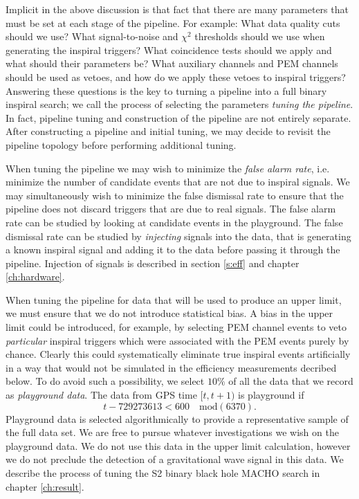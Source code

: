 Implicit in the above discussion is that fact that there are many parameters
that must be set at each stage of the pipeline. For example: What data quality
cuts should we use? What signal-to-noise and $\chi^2$ thresholds should we use
when generating the inspiral triggers? What coincidence tests should we apply
and what should their parameters be? What auxiliary channels and PEM channels
should be used as vetoes, and how do we apply these vetoes to inspiral
triggers? Answering these questions is the key to turning a pipeline into a
full binary inspiral search; we call the process of selecting the parameters
\emph{tuning the pipeline}. In fact, pipeline tuning and construction of the
pipeline are not entirely separate. After constructing a pipeline and initial
tuning, we may decide to revisit the pipeline topology before performing
additional tuning.

When tuning the pipeline we may wish to minimize the \emph{false alarm rate},
i.e. minimize the number of candidate events that are not due to inspiral
signals.  We may simultaneously wish to minimize the false dismissal rate to
ensure that the pipeline does not discard triggers that are due to real
signals.  The false alarm rate can be studied by looking at candidate events
in the playground. The false dismissal rate can be studied by \emph{injecting}
signals into the data, that is generating a known inspiral signal and adding
it to the data before passing it through the pipeline.  Injection of signals
is described in section \ref{s:eff} and chapter \ref{ch:hardware}.

When tuning the pipeline for data that will be used to produce an upper limit,
we must ensure that we do not introduce statistical bias. A bias in the upper
limit could be introduced, for example, by selecting PEM channel events to
veto \emph{particular} inspiral triggers which were associated with the  PEM
events purely by chance. Clearly this could systematically eliminate true
inspiral events artificially in a way that would not be simulated in the
efficiency measurements decribed below. To do avoid such a possibility, we
select $10\%$ of all the data that we record as \emph{playground data}. The
data from GPS time $[t,t+1)$ is playground if 
\begin{equation}
t - 729273613 < 600 \quad \mathrm{mod}(6370).
\end{equation}
Playground data is selected algorithmically to provide a representative sample
of the full data set. We are free to pursue whatever investigations we
wish on the playground data. We do not use this data in the upper limit
calculation, however we do not preclude the detection of a gravitational wave
signal in this data. We describe the process of tuning the S2 binary black
hole MACHO search in chapter \ref{ch:result}.

